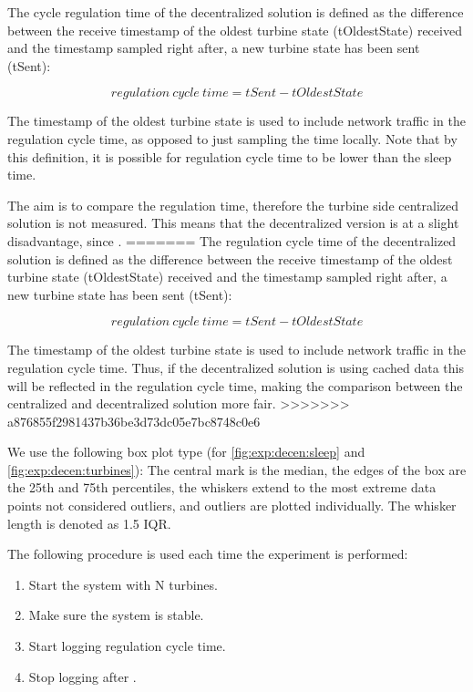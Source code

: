 The cycle regulation time of the decentralized solution is defined as the difference between the receive timestamp of the oldest turbine state (tOldestState) received and the timestamp sampled right after, a new turbine state has been sent (tSent):

$$regulation~cycle~time=tSent-tOldestState$$

The timestamp of the oldest turbine state is used to include network traffic in the regulation cycle time, as opposed to just sampling the time locally. Note that by this definition, it is possible for regulation cycle time to be lower than the sleep time. 

The aim is to compare the regulation time, therefore the turbine side centralized solution is not measured. This means that the decentralized version is at a slight disadvantage, since .
=======
The regulation cycle time of the decentralized solution is defined as the difference between the receive timestamp of the oldest turbine state (tOldestState) received and the timestamp sampled right after, a new turbine state has been sent (tSent):

$$regulation~cycle~time=tSent-tOldestState$$

The timestamp of the oldest turbine state is used to include network traffic in the regulation cycle time. Thus, if the decentralized solution is using cached data this will be reflected in the regulation cycle time, making the comparison between the centralized and decentralized solution more fair. 
>>>>>>> a876855f2981437b36be3d73dc05e7bc8748c0e6

We use the following box plot type (for \cref{fig:exp:decen:sleep} and \cref{fig:exp:decen:turbines}): The central mark is the median, the edges of the box are the 25th and 75th percentiles, the whiskers extend to the most extreme data points not considered outliers, and outliers are plotted individually. The whisker length is denoted as 1.5 IQR. 

The following procedure is used each time the experiment is performed:

\begin{minipage}{\textwidth}
	\begin{enumerate}
		\item Start the system with N turbines.
		\item Make sure the system is stable.
		\item Start logging regulation cycle time.
		\item Stop logging after \experiemntRunTime.
		\end{enumerate}
\end{minipage}


